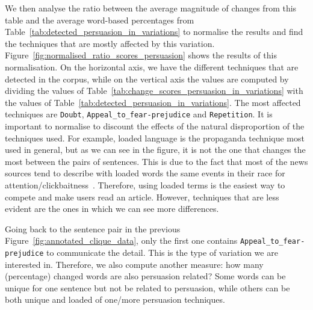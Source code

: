 We then analyse the ratio between the average magnitude of changes from this table and the average word-based percentages from Table~\ref{tab:detected_persuasion_in_variations} to normalise the results and find the techniques that are mostly affected by this variation.
Figure~\ref{fig:normalised_ratio_scores_persuasion} shows the results of this normalisation.
On the horizontal axis, we have the different techniques that are detected in the corpus, while on the vertical axis the values are computed by dividing the values of Table~\ref{tab:change_scores_persuasion_in_variations} with the values of Table~\ref{tab:detected_persuasion_in_variations}.
The most affected techniques are \texttt{Doubt}, \texttt{Appeal\_to\_fear-prejudice} and \texttt{Repetition}.
It is important to normalise to discount the effects of the natural disproportion of the techniques used.
For example, loaded language is the propaganda technique most used in general, but as we can see in the figure, it is not the one that changes the most between the pairs of sentences. This is due to the fact that
most of the news sources tend to describe with loaded words the same events in their race for attention/clickbaitness~\citep{bazaco2019clickbait,davenport2001attention}.
Therefore, using loaded terms is the easiest way to compete and make users read an article. However, techniques that are less evident are the ones in which we can see more differences.


Going back to the sentence pair in the previous Figure~\ref{fig:annotated_clique_data}, only the first one contains \texttt{Appeal\_to\_fear-prejudice} to communicate the detail. This is the type of variation we are interested in.
%
Therefore, we also compute another measure: how many (percentage) changed words are also persuasion related? Some words can be unique for one sentence but not be related to persuasion, while others can be both unique and loaded of one/more persuasion techniques.

